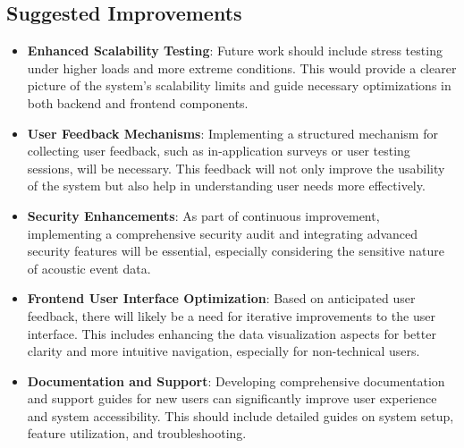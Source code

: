 \subsection{Suggested Improvements}
\begin{itemize}
  \item \textbf{Enhanced Scalability Testing}: Future work should include stress testing under higher loads and more extreme conditions. This would provide a clearer picture of the system's scalability limits and guide necessary optimizations in both backend and frontend components.
  \item \textbf{User Feedback Mechanisms}: Implementing a structured mechanism for collecting user feedback, such as in-application surveys or user testing sessions, will be necessary. This feedback will not only improve the usability of the system but also help in understanding user needs more effectively.
  \item \textbf{Security Enhancements}: As part of continuous improvement, implementing a comprehensive security audit and integrating advanced security features will be essential, especially considering the sensitive nature of acoustic event data.
  \item \textbf{Frontend User Interface Optimization}: Based on anticipated user feedback, there will likely be a need for iterative improvements to the user interface. This includes enhancing the data visualization aspects for better clarity and more intuitive navigation, especially for non-technical users.
  \item \textbf{Documentation and Support}: Developing comprehensive documentation and support guides for new users can significantly improve user experience and system accessibility. This should include detailed guides on system setup, feature utilization, and troubleshooting.
\end{itemize}
